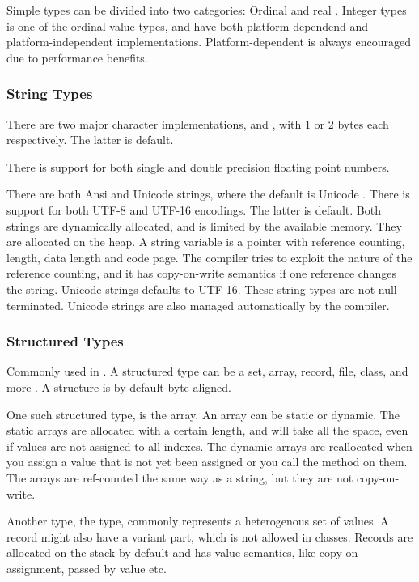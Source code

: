 Simple types can be divided into two categories: Ordinal and real \cite{noauthor_undated-st}. Integer types is one of the ordinal value types, and have both platform-dependend and platform-independent implementations. Platform-dependent is always encouraged due to performance benefits.

\subsubsection{String Types}
\label{ssub:String Types}
There are two major character implementations,  and , with 1 or 2 bytes each respectively. The latter is default.

There is support for both single and double precision floating point numbers.

There are both Ansi and Unicode strings, where the default is Unicode \cite{noauthor_undated-cp}. There is support for both UTF-8 and UTF-16 encodings. The latter is default. Both strings are dynamically allocated, and is limited by the available memory. They are allocated on the heap. A string variable is a pointer with reference counting, length, data length and code page. The compiler tries to exploit the nature of the reference counting, and it has copy-on-write semantics if one reference changes the string. Unicode strings defaults to UTF-16. These string types are not null-terminated. Unicode strings are also managed automatically by the compiler.

\subsubsection{Structured Types}
\label{ssub:Structured Types}
Commonly used in \delphi. A structured type can be a set, array, record, file, class, and more \cite{noauthor_undated-vu}. A structure is by default byte-aligned.

One such structured type, is the array. An array can be static or dynamic. The static arrays are allocated with a certain length, and will take all the space, even if values are not assigned to all indexes. The dynamic arrays are reallocated when you assign a value that is not yet been assigned or you call the  method on them. The arrays are ref-counted the same way as a string, but they are not copy-on-write.

Another type, the  type, commonly represents a heterogenous set of values. A record might also have a variant part, which is not allowed in classes. Records are allocated on the stack by default and has value semantics, like copy on assignment, passed by value etc.

